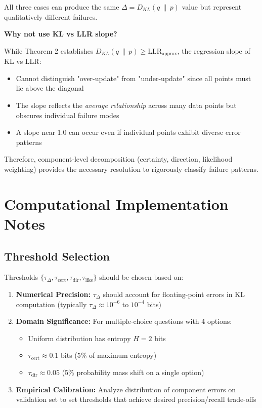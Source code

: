 \documentclass{article}
\theoremstyle{definition}
\begin{document}
All three cases can produce the same $\Delta = D_{KL}(q \,\|\, p)$ value but represent qualitatively different failures.

\textbf{Why not use KL vs LLR slope?}

While Theorem 2 establishes $D_{KL}(q \,\|\, p) \geq \text{LLR}_{\text{approx}}$, the regression slope of KL vs LLR:
\begin{itemize}
    \item Cannot distinguish "over-update" from "under-update" since all points must lie above the diagonal
    \item The slope reflects the \emph{average relationship} across many data points but obscures individual failure modes
    \item A slope near 1.0 can occur even if individual points exhibit diverse error patterns
\end{itemize}

Therefore, component-level decomposition (certainty, direction, likelihood weighting) provides the necessary resolution to rigorously classify failure patterns.


\section{Computational Implementation Notes}

\subsection{Threshold Selection}

Thresholds $\{\tau_{\Delta}, \tau_{\text{cert}}, \tau_{\text{dir}}, \tau_{\text{like}}\}$ should be chosen based on:
\begin{enumerate}
    \item \textbf{Numerical Precision:} $\tau_{\Delta}$ should account for floating-point errors in KL computation (typically $\tau_{\Delta} \approx 10^{-6}$ to $10^{-4}$ bits)
    \item \textbf{Domain Significance:} For multiple-choice questions with 4 options:
    \begin{itemize}
        \item Uniform distribution has entropy $H = 2$ bits
        \item $\tau_{\text{cert}} \approx 0.1$ bits (5\% of maximum entropy)
        \item $\tau_{\text{dir}} \approx 0.05$ (5\% probability mass shift on a single option)
    \end{itemize}
    \item \textbf{Empirical Calibration:} Analyze distribution of component errors on validation set to set thresholds that achieve desired precision/recall trade-offs
\end{enumerate}
\end{document}
